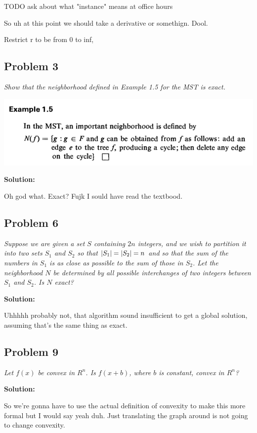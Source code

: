 \documentclass[11pt, a4paper]{article}
\DeclarePairedDelimiter{\abs}{\lvert}{\rvert}
\newcommand{\solution}{ \noindent \textbf{Solution:}}
\newcommand{\problem}[1]{\textit{#1} \medskip}
\begin{document}
TODO ask about what "instance" means at office hours

So uh at this point we should take a derivative or somethign. Dool.

Restrict r to be from 0 to inf, 

\subsection*{Problem 3}

\problem{Show that the neighborhood defined in Example 1.5 for the MST is exact.}

\includegraphics[scale=0.4]{ex15}

\solution

Oh god what. Exact? Fujk I sould have read the textbood.

\subsection*{Problem 6}

\problem{Suppose we are given a set $S$ containing $2n$ integers, and we wish to partition it into
two sets $S_1$ and $S_2$ so that $\abs{S_1}=\abs{S_2}=n$ and so that the sum of the numbers in $S_1$
is as close as possible to the sum of those in $S_2$. Let the neighborhood $N$ be determined by all
possible interchanges of two integers between $S_1$ and $S_2$. Is $N$ exact?}

\solution

Uhhhhh probably not, that algorithm sound insufficient to get a global solution, assuming that's the
same thing as exact.


\subsection*{Problem 9}

\problem{Let $f(x)$ be convex in $R^n$. Is $f(x+b)$, where $b$ is constant, convex in $R^n$?}

\solution

So we're gonna have to use the actual definition of convexity to make this more formal but I would
say yeah duh. Just translating the graph around is not going to change convexity. 
\end{document}

